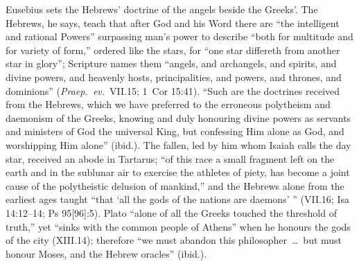 Eusebius sets the Hebrews' doctrine of the angels beside the Greeks'.
The Hebrews, he says, teach that after God and his Word there are ``the
intelligent and rational Powers'' surpassing man's power to describe
``both for multitude and for variety of form,'' ordered like the stars,
for ``one star differeth from another star in glory''; Scripture names
them ``angels, and archangels, and spirits, and divine powers, and
heavenly hosts, principalities, and powers, and thrones, and dominions''
(\emph{Praep.\ ev.}\ VII.15; 1~Cor 15:41). ``Such are the doctrines
received from the Hebrews, which we have preferred to the erroneous
polytheism and daemonism of the Greeks, knowing and duly honouring
divine powers as servants and ministers of God the universal King, but
confessing Him alone as God, and worshipping Him alone'' (ibid.). The
fallen, led by him whom Isaiah calls the day star, received an abode in
Tartarus; ``of this race a small fragment left on the earth and in the
sublunar air to exercise the athletes of piety, has become a joint cause
of the polytheistic delusion of mankind,'' and the Hebrews alone from
the earliest ages taught ``that `all the gods of the nations are
daemons' '' (VII.16; Isa 14:12--14; Ps 95[96]:5). Plato ``alone of all
the Greeks touched the threshold of truth,'' yet ``sinks with the common
people of Athens'' when he honours the gods of the city
(XIII.14); therefore ``we must abandon this philosopher~\dots\ but must
honour Moses, and the Hebrew oracles'' (ibid.).

